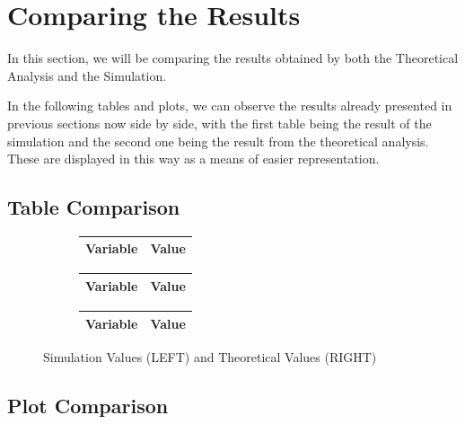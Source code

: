 \clearpage

\section{Comparing the Results}
\label{sec:comparing}

In this section, we will be comparing the results obtained by both the Theoretical Analysis and the Simulation.

In the following tables and plots, we can observe the results already presented in previous sections now side by side, with the first table being the result of the simulation and the second one being the result from the theoretical analysis. These are displayed in this
way as a means of easier representation.

\subsection{Table Comparison}


\begin{figure}[ht]
\centering
\begin{subfigure}{.5\textwidth}
  \centering
  \begin{tabular}{|l|r|}
  \hline    
  {\bf Variable} & {\bf Value} \\ \hline
  
 \end{tabular}
 \begin{tabular}{|l|r|}
  \hline    
  {\bf Variable} & {\bf Value} \\ \hline
  
  \end{tabular}
\end{subfigure}%
\begin{subfigure}{.4\textwidth}
  \centering
  \begin{tabular}{|l|r|}
  \hline    
  {\bf Variable} & {\bf Value} \\ \hline
  
  \end{tabular}
\end{subfigure}
\caption{Simulation Values (LEFT) and Theoretical Values (RIGHT)}
\label{fig:sbs1}
\end{figure}


\subsection{Plot Comparison}

\vspace{-3cm}

